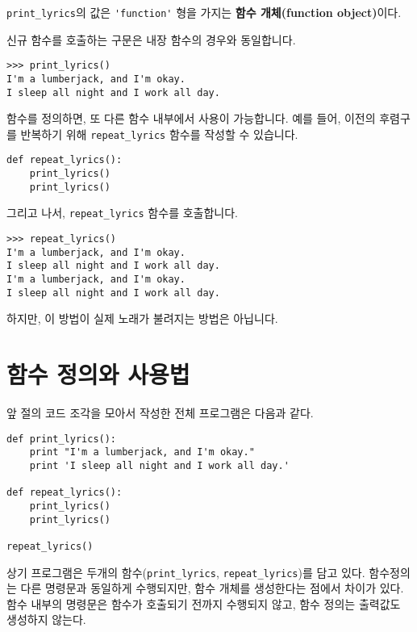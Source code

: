\verb"print_lyrics"의 값은 \verb"'function'" 형을 가지는 {\bf 함수 개체(function object)}이다. 

신규 함수를 호출하는 구문은 내장 함수의 경우와 동일합니다.

\beforeverb
\begin{verbatim}
>>> print_lyrics()
I'm a lumberjack, and I'm okay.
I sleep all night and I work all day.
\end{verbatim}
\afterverb
%

함수를 정의하면, 또 다른 함수 내부에서 사용이 가능합니다.
예를 들어, 이전의 후렴구를 반복하기 위해 \verb"repeat_lyrics" 함수를 작성할 수 있습니다.

\beforeverb
\begin{verbatim}
def repeat_lyrics():
    print_lyrics()
    print_lyrics()
\end{verbatim}
\afterverb
%

그리고 나서, \verb"repeat_lyrics" 함수를 호출합니다.

\beforeverb
\begin{verbatim}
>>> repeat_lyrics()
I'm a lumberjack, and I'm okay.
I sleep all night and I work all day.
I'm a lumberjack, and I'm okay.
I sleep all night and I work all day.
\end{verbatim}
\afterverb
%

하지만, 이 방법이 실제 노래가 불려지는 방법은 아닙니다.

\section{함수 정의와 사용법}

앞 절의 코드 조각을 모아서 작성한 전체 프로그램은 다음과 같다.

\beforeverb
\begin{verbatim}
def print_lyrics():
    print "I'm a lumberjack, and I'm okay."
    print 'I sleep all night and I work all day.'

def repeat_lyrics():
    print_lyrics()
    print_lyrics()

repeat_lyrics()
\end{verbatim}
\afterverb
%

상기 프로그램은 두개의 함수(\verb"print_lyrics", \verb"repeat_lyrics")를 담고 있다.
함수정의는 다른 명령문과 동일하게 수행되지만, 함수 개체를 생성한다는 점에서 차이가 있다.
함수 내부의 명령문은 함수가 호출되기 전까지 수행되지 않고, 함수 정의는 출력값도 생성하지 않는다.

